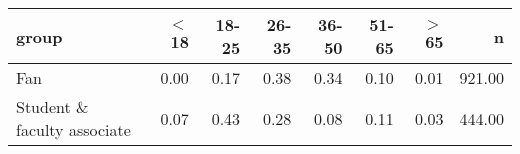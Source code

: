 \begin{tabular}{lrrrrrrr}
  \hline
group & $<$18 & 18-25 & 26-35 & 36-50 & 51-65 & $>$65 & n \\ 
  \hline
Fan & 0.00 & 0.17 & 0.38 & 0.34 & 0.10 & 0.01 & 921.00 \\ 
  Student \& faculty associate & 0.07 & 0.43 & 0.28 & 0.08 & 0.11 & 0.03 & 444.00 \\ 
   \hline
\end{tabular}
